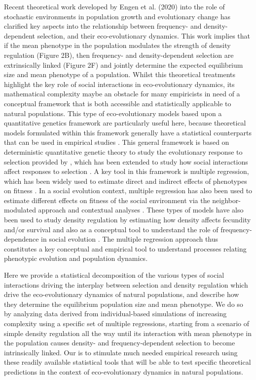 \documentclass{article}
\begin{document}
 Recent theoretical work developed by Engen et al. (2020) into the role of stochastic environments in population growth and evolutionary change has clarified key aspects into the relationship between frequency- and density-dependent selection, and their eco-evolutionary dynamics. This work implies that if the mean phenotype in the population modulates the strength of density regulation (Figure 2B), then frequency- and density-dependent selection are extrinsically linked (Figure 2F) and jointly determine the expected equilibrium size and mean phenotype of a population. Whilst this theoretical treatments highlight the key role of social interactions in eco-evolutionary dynamics, its mathematical complexity maybe an obstacle for many empiricists in need of a conceptual framework that is both accessible and statistically applicable to natural populations. This type of eco-evolutionary models based upon a quantitative genetics framework are particularly useful here, because theoretical models formulated within this framework generally have a statistical counterparts that can be used in empirical studies  \citep{Lande1983, Robertson1966}. This general framework is based on deterministic quantitative genetic theory to study the evolutionary response to selection provided by \cite{Lande1976, Lande1979, Lande1983}, which has been extended to study how social interactions affect responses to selection \citep{Queller1985a, Wolf1999SocialSelection, McGlothlin2010}. A key tool in this framework is multiple regression, which has been widely used to estimate direct and indirect effects of phenotypes on fitness \citep{Kingsolver2011}. In a social evolution context, multiple regression has also been used to estimate different effects on fitness of the social environment via the neighbor-modulated approach and contextual analyses \citep{Heisler1987}. These types of models have also been used to study density regulation by estimating how density affects fecundity and/or survival \citep{Araya-Ajoy2021, Saether2021} and also as a conceptual tool to understand the role of frequency-dependence in social evolution \citep{Araya-Ajoy2020, Westneat2012a}. The multiple regression approach thus constitutes a key conceptual and empirical tool to understand processes relating phenotypic evolution and population dynamics. 

Here we provide a statistical decomposition of the various types of social interactions driving the interplay between selection and density regulation which drive the eco-evolutionary dynamics of natural populations, and describe how they determine the equilibrium population size and mean phenotype. We do so by analyzing data derived from individual-based simulations of increasing complexity using a specific set of multiple regressions, starting from a scenario of simple density regulation all the way until its interaction with mean phenotype in the population causes density- and frequency-dependent selection to become intrinsically linked. Our is to stimulate much needed empirical research using these readily available statistical tools that will be able to test specific theoretical predictions in the context of eco-evolutionary dynamics in natural populations.
\end{document}
